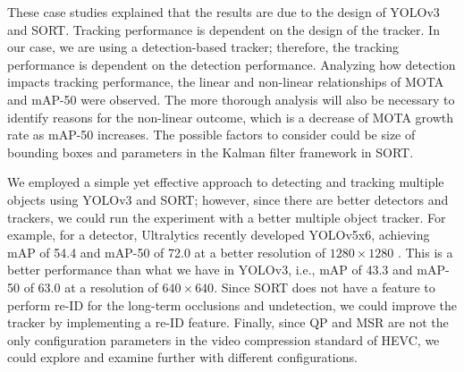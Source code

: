 These case studies explained that the results are due to the design of YOLOv3 and SORT. Tracking performance is dependent on the design of the tracker. In our case, we are using a detection-based tracker; therefore, the tracking performance is dependent on the detection performance. Analyzing how detection impacts tracking performance, the linear and non-linear relationships of MOTA and mAP-50 were observed. The more thorough analysis will also be necessary to identify reasons for the non-linear outcome, which is a decrease of MOTA growth rate as mAP-50 increases. The possible factors to consider could be size of bounding boxes and parameters in the Kalman filter framework in SORT.

We employed a simple yet effective approach to detecting and tracking multiple objects using YOLOv3 and SORT; however, since there are better detectors and trackers, we could run the experiment with a better multiple object tracker. For example, for a detector, Ultralytics recently developed YOLOv5x6, achieving mAP of 54.4 and mAP-50 of 72.0 at a better resolution of $1280 \times 1280$ \cite{jocher_ultralyticsyolov5_2021}. This is a better performance than what we have in YOLOv3, i.e., mAP of 43.3 and mAP-50 of 63.0 at a resolution of $640 \times 640$. Since SORT does not have a feature to perform re-ID for the long-term occlusions and undetection, we could improve the tracker by implementing a re-ID feature. Finally, since QP and MSR are not the only configuration parameters in the video compression standard of HEVC, we could explore and examine further with different configurations.